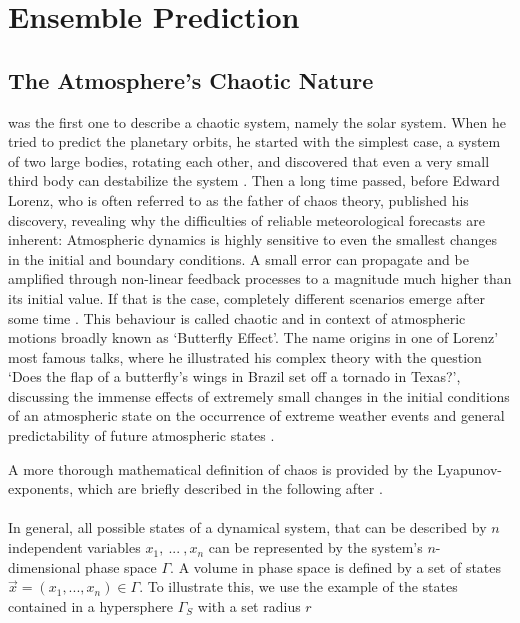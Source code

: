 
\section{Ensemble Prediction}
\subsection{The Atmosphere's Chaotic Nature}

\citeauthor{poincare1897forme} was the first one to describe a chaotic system, namely the solar system. When he tried to predict the planetary orbits, he started with the simplest case, a system of two large bodies, rotating each other, and discovered that even a very small third body can destabilize the system  \cite{poincare1897forme}.
Then a long time passed, before Edward Lorenz, who is often referred to as the father of chaos theory, published his discovery, revealing why the difficulties of reliable meteorological forecasts are inherent:
Atmospheric dynamics is highly sensitive to even the smallest changes in the initial and boundary conditions. A small error can propagate and be amplified through non-linear feedback processes to a magnitude much higher than its initial value. If that is the case, completely different scenarios emerge after some time \cite{lorenz1963deterministic}. This behaviour is called chaotic and in context of atmospheric motions broadly known as `Butterfly Effect'. The name origins in one of Lorenz' most famous talks, where he illustrated his complex theory with the question `Does the flap  of a butterfly's  wings in Brazil set off a tornado  in Texas?', discussing the immense effects of extremely small changes in the initial conditions of an atmospheric state on the occurrence of extreme weather events and general predictability of future atmospheric states \parencite{lorenz2000butterfly}. 

A more thorough mathematical definition of chaos is provided by the Lyapunov-exponents, which are briefly described in the following after \citeauthor{kalnay2003atmospheric} \cite{kalnay2003atmospheric}.\\ \\
In general, all possible states of a dynamical system, that can be described by $n$ independent variables $x_{1}, \ ... \ , x_{n}$ can be represented by the system's $n$-dimensional phase space $\Gamma$.
A volume in phase space is defined by a set of states $\vec{x}=(x_{1}, ... , x_{n}) \in \Gamma$. To illustrate this, we use the example of the states contained in a hypersphere $\Gamma_{S}$ with a set radius $r$

